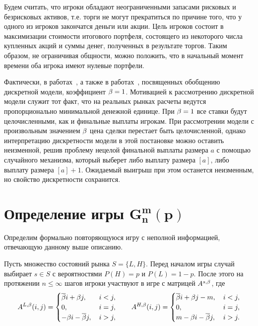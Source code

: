 {Будем считать, что игроки обладают неограниченными запасами рисковых и безрисковых активов, т.е. торги не могут прекратиться по причине того, что у одного из игроков закончатся деньги или акции.
Цель игроков состоит в максимизации стоимости итогового портфеля, состоящего из некоторого числа купленных акций и суммы денег, полученных в результате торгов.
Таким образом, не ограничивая общности, можно положить, что в начальный момент времени оба игрока имеют нулевые портфели.

Фактически, в работах~\cite{domansky07, demeyer05}, а также в работах~\cite{domansky11, domansky13, domansky14}, посвященных обобщению дискретной модели, коэффициент $\beta = 1$.
Мотивацией к рассмотрению дискретной модели служит тот факт, что на реальных рынках расчеты ведутся пропорционально минимальной денежной единице.
При $\beta = 1$ все ставки будут целочисленными, как и финальные выплаты игрокам.
При рассмотрении модели с произвольным значением $\beta$ цена сделки перестает быть целочисленной, однако интерпретацию дискретности модели в этой постановке можно оставить неизменной, решив проблему нецелой финальной выплаты размера $a$ с помощью случайного механизма, который выберет либо выплату размера $[a]$, либо выплату размера $[a] + 1$.
Ожидаемый выигрыш при этом останется неизменным, но свойство дискретности сохранится.

\section{Определение игры $\mathbf{G^m_n(p)}$}\label{ch1:formal-def}

Определим формально повторяющуюся игру с неполной информацией, отвечающую данному выше описанию. 

Пусть множество состояний рынка $S = \{L, H\}$. Перед началом игры случай выбирает $s \in S $ с вероятностями $P(H) = p$ и $P(L) = 1 - p$.
После этого на протяжении $n \leq \infty$ шагов игроки участвуют в игре с матрицей $A^{s,\beta}$, где
\begin{equation*}
  A^{L,\beta}(i, j) = \begin{cases}
    {\overline{\beta}} i + \beta j, &\, i < j, \\
    0, &\, i = j, \\
    -\beta i - {\overline{\beta}} j, &\, i > j,
  \end{cases}
  \qquad
  A^{H,\beta}(i, j) = \begin{cases}
    {\overline{\beta}} i + \beta j - m, &\, i < j, \\
    0, &\, i = j, \\
    m - \beta i - {\overline{\beta}} j, &\, i > j.
  \end{cases}
\end{equation*}

}
